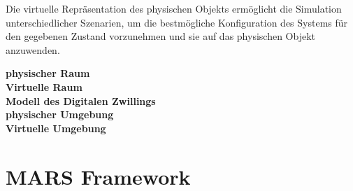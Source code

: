 Die virtuelle Repräsentation des physischen Objekts ermöglicht die Simulation unterschiedlicher Szenarien, um die bestmögliche Konfiguration des Systems für den gegebenen Zustand vorzunehmen und sie auf das physischen Objekt anzuwenden. 

\textbf{physischer Raum} \\

\textbf{Virtuelle Raum} \\

\textbf{Modell des Digitalen Zwillings} \\

\textbf{physischer Umgebung} \\

\textbf{Virtuelle Umgebung} \\

\section{MARS Framework}





